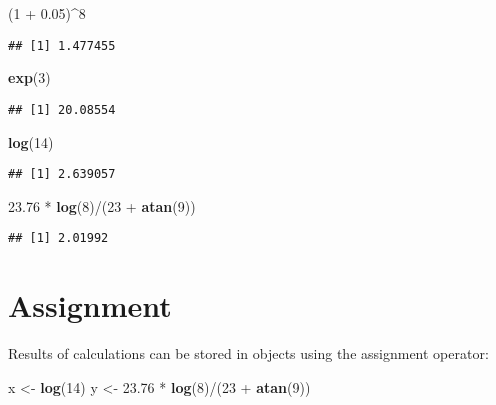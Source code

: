 \documentclass[]{book}
\newenvironment{Shaded}{\begin{snugshade}}{\end{snugshade}}
\newcommand{\KeywordTok}[1]{\textcolor[rgb]{0.13,0.29,0.53}{\textbf{{#1}}}}
\newcommand{\DecValTok}[1]{\textcolor[rgb]{0.00,0.00,0.81}{{#1}}}
\newcommand{\FloatTok}[1]{\textcolor[rgb]{0.00,0.00,0.81}{{#1}}}
\newcommand{\StringTok}[1]{\textcolor[rgb]{0.31,0.60,0.02}{{#1}}}
\newcommand{\NormalTok}[1]{{#1}}
\begin{document}
\begin{Shaded}
\begin{Highlighting}[]
\NormalTok{(}\DecValTok{1} \NormalTok{+}\StringTok{ }\FloatTok{0.05}\NormalTok{)^}\DecValTok{8}
\end{Highlighting}
\end{Shaded}

\begin{verbatim}
## [1] 1.477455
\end{verbatim}

\begin{Shaded}
\begin{Highlighting}[]
\KeywordTok{exp}\NormalTok{(}\DecValTok{3}\NormalTok{)}
\end{Highlighting}
\end{Shaded}

\begin{verbatim}
## [1] 20.08554
\end{verbatim}

\begin{Shaded}
\begin{Highlighting}[]
\KeywordTok{log}\NormalTok{(}\DecValTok{14}\NormalTok{)}
\end{Highlighting}
\end{Shaded}

\begin{verbatim}
## [1] 2.639057
\end{verbatim}

\begin{Shaded}
\begin{Highlighting}[]
\FloatTok{23.76} \NormalTok{*}\StringTok{ }\KeywordTok{log}\NormalTok{(}\DecValTok{8}\NormalTok{)/(}\DecValTok{23} \NormalTok{+}\StringTok{ }\KeywordTok{atan}\NormalTok{(}\DecValTok{9}\NormalTok{))}
\end{Highlighting}
\end{Shaded}

\begin{verbatim}
## [1] 2.01992
\end{verbatim}

\section{Assignment}\label{assignment}

Results of calculations can be stored in objects using the assignment
operator:

\begin{Shaded}
\begin{Highlighting}[]
\NormalTok{x <-}\StringTok{ }\KeywordTok{log}\NormalTok{(}\DecValTok{14}\NormalTok{)}
\NormalTok{y <-}\StringTok{ }\FloatTok{23.76} \NormalTok{*}\StringTok{ }\KeywordTok{log}\NormalTok{(}\DecValTok{8}\NormalTok{)/(}\DecValTok{23} \NormalTok{+}\StringTok{ }\KeywordTok{atan}\NormalTok{(}\DecValTok{9}\NormalTok{))}
\end{Highlighting}
\end{Shaded}
\end{document}
